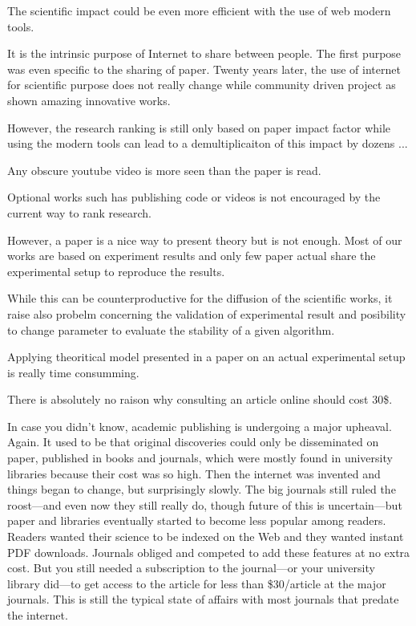 The scientific impact could be even more efficient with the use of web modern tools.

It is the intrinsic purpose of Internet to share between people.
The first purpose was even specific to the sharing of paper.
Twenty years later, the use of internet for scientific purpose does not really change while community driven project as shown amazing innovative works.

However, the research ranking is still only based on paper impact factor while using the modern tools can lead to a demultiplicaiton of this impact by dozens ...

Any obscure youtube video is more seen than the paper is read.

Optional works such has publishing code or videos is not encouraged by the current way to rank research.

However, a paper is a nice way to present theory but is not enough.
Most of our works are based on experiment results and only few paper actual share the experimental setup to reproduce the results.

While this can be counterproductive for the diffusion of the scientific works, it raise also probelm concerning the validation of experimental result and posibility to change parameter to evaluate the stability of a given algorithm.

Applying theoritical model presented in a paper on an actual experimental setup is really time consumming.

There is absolutely no raison why consulting an article online should cost 30\$.

In case you didn’t know, academic publishing is undergoing a major upheaval.
Again.
It used to be that original discoveries could only be disseminated on paper, published in books and journals, which were mostly found in university libraries because their cost was so high.
Then the internet was invented and things began to change, but surprisingly slowly.
The big journals still ruled the roost—and even now they still really do, though future of this is uncertain—but paper and libraries eventually started to become less popular among readers.
Readers wanted their science to be indexed on the Web and they wanted instant PDF downloads.
Journals obliged and competed to add these features at no extra cost.
But you still needed a subscription to the journal—or your university library did—to get access to the article for less than \$30/article at the major journals.
This is still the typical state of affairs with most journals that predate the internet.

